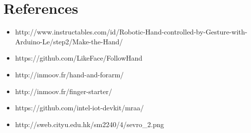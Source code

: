 \documentclass[11pt,a4paper]{article}
\begin{document}
	\section{References}
	\begin{itemize}
	    \item http://www.instructables.com/id/Robotic-Hand-controlled-by-Gesture-with-Arduino-Le/step2/Make-the-Hand/
	    \item https://github.com/LikeFace/FollowHand
	    \item http://inmoov.fr/hand-and-forarm/
	    \item http://inmoov.fr/finger-starter/
	    \item https://github.com/intel-iot-devkit/mraa/
	    \item http://sweb.cityu.edu.hk/sm2240/4/sevro\_2.png
	\end{itemize}
\end{document}
